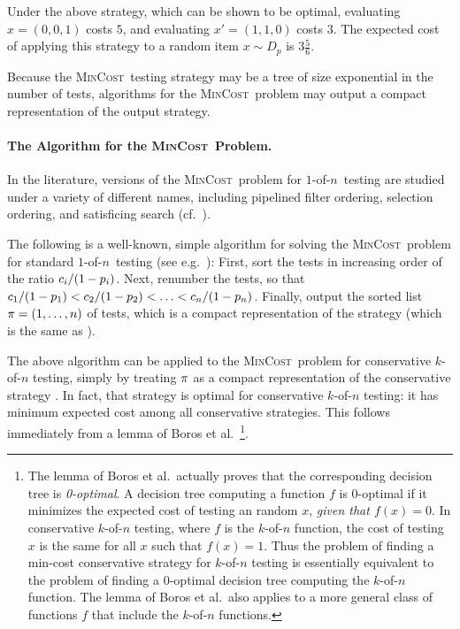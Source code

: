 \documentclass{article}
\newcounter{ass}
\newcommand{\ens}[1]{\ensuremath{#1}}					\newcommand{\card}[1]{\ens{|#1|}}							\newcommand{\dotlist}[2]{\ens{#1,\ldots,#2}}
\newcommand{\anitem}{\ens{x}}
\newcommand{\valn}{\ens{n}}
\newcommand{\valk}{\ens{k}}
\newcommand{\mincost}{\textsc{MinCost}}
\newcommand{\kofn}{\valk-of-\valn}
\newcommand{\oneofn}{$1$-of-\valn}
\begin{document}
Under the above strategy, which can be shown to be optimal,
evaluating $\anitem=(0,0,1)$ costs
$5$, and
evaluating 
$\anitem'=(1,1,0)$ costs $3$.
The expected cost of applying this strategy to a random item $\anitem \sim D_p$ is $3\frac{5}{6}$. 



Because the \mincost\ testing strategy may be a 
tree of  size exponential in the
number of tests,  algorithms for the
\mincost\ problem may output a compact representation of the output strategy.
\paragraph{The Algorithm for the \mincost\ Problem.}

In the literature, versions of the \mincost\ problem 
for \oneofn\ testing are studied under a variety of different
names, including pipelined filter ordering, selection ordering, 
and satisficing search (cf.~\cite{journals/talg/CondonDHW09}).

The following is a well-known, simple
algorithm for solving the \mincost\ problem for standard \oneofn\ testing
(see e.g.~\cite{GAREY73}):
First, sort the
tests in increasing order of the ratio $\cost i/(1-\pr i)$.
Next, renumber the tests, so that
$\cost 1/(1-\pr 1) < \cost 2/(1-p_2) < \ldots < \cost{\valn}/(1-\pr{\valn})$.
Finally, output the sorted list $\perm = (1,\ldots, n)$ of tests, which
is a compact representation of the strategy  (which is the same as ).

The above algorithm can be applied to the \mincost\ problem
for conservative \kofn{} testing, simply by treating $\perm$ as
a compact representation of the conservative strategy \cstrat{\valk}{\perm}.
In fact, that strategy is optimal for conservative \kofn{} testing: it has
minimum expected cost among
all conservative strategies.   This follows immediately from a lemma of Boros et al.~\cite{journals/amai/BorosU99}\footnote{The lemma of Boros et al.~actually 
proves that the corresponding decision tree is {\em 0-optimal}.
A decision tree computing a function $f$ 
is 0-optimal if it minimizes the expected cost of
testing an random $x$, {\em given that $f(x) = 0$}.
In conservative \kofn{} testing, where $f$ is the
\kofn{} function, the cost of testing $x$ is the same for all $x$ such that $f(x) = 1$.
Thus the problem of finding a min-cost conservative strategy for \kofn{} testing
is essentially equivalent to the problem of finding a 0-optimal decision tree
computing the \kofn{} function.  The lemma of Boros et al.~also applies to a more
general class of functions $f$ that include the \kofn{} functions.
}. 
\end{document}
